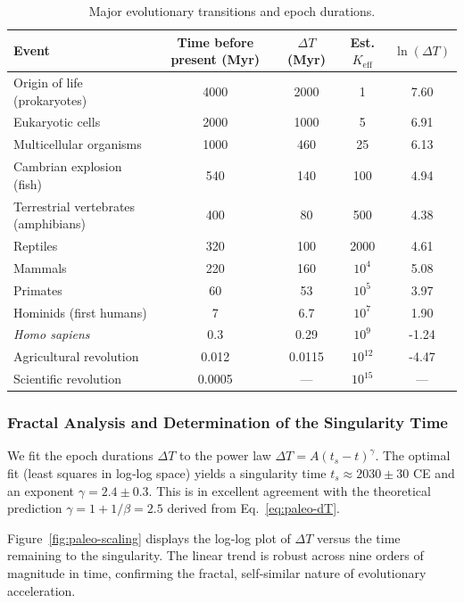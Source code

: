\documentclass[12pt,a4paper]{article}
\theoremstyle{remark}
\begin{document}
	\begin{table}[htbp]
		\centering
		\caption{Major evolutionary transitions and epoch durations.}
		\label{tab:evolutionary-epochs}
		\footnotesize \begin{tabular}{l c c c c}
			\toprule
			\textbf{Event} & \textbf{Time before present (Myr)} & \(\Delta T\) (Myr) & Est. \(K_{\mathrm{eff}}\) & \(\ln(\Delta T)\) \\
			\midrule
			Origin of life (prokaryotes) & 4000 & 2000 & 1 & 7.60 \\
			Eukaryotic cells & 2000 & 1000 & 5 & 6.91 \\
			Multicellular organisms & 1000 & 460 & 25 & 6.13 \\
			Cambrian explosion (fish) & 540 & 140 & 100 & 4.94 \\
			Terrestrial vertebrates (amphibians) & 400 & 80 & 500 & 4.38 \\
			Reptiles & 320 & 100 & 2000 & 4.61 \\
			Mammals & 220 & 160 & \(10^4\) & 5.08 \\
			Primates & 60 & 53 & \(10^5\) & 3.97 \\
			Hominids (first humans) & 7 & 6.7 & \(10^7\) & 1.90 \\
			\emph{Homo sapiens} & 0.3 & 0.29 & \(10^9\) & -1.24 \\
			Agricultural revolution & 0.012 & 0.0115 & \(10^{12}\) & -4.47 \\
			Scientific revolution & 0.0005 & --- & \(10^{15}\) & --- \\
			\bottomrule
		\end{tabular}
	\end{table}
	
	\subsubsection{Fractal Analysis and Determination of the Singularity Time}
	
	We fit the epoch durations \(\Delta T\) to the power law \(\Delta T = A (t_s - t)^{\gamma}\). The optimal fit (least squares in log‑log space) yields a singularity time \(t_s \approx 2030 \pm 30\) CE and an exponent \(\gamma = 2.4 \pm 0.3\). This is in excellent agreement with the theoretical prediction \(\gamma = 1 + 1/\beta = 2.5\) derived from Eq.~\eqref{eq:paleo-dT}.
	
	Figure~\ref{fig:paleo-scaling} displays the log‑log plot of \(\Delta T\) versus the time remaining to the singularity. The linear trend is robust across nine orders of magnitude in time, confirming the fractal, self‑similar nature of evolutionary acceleration.
	
\end{document}
